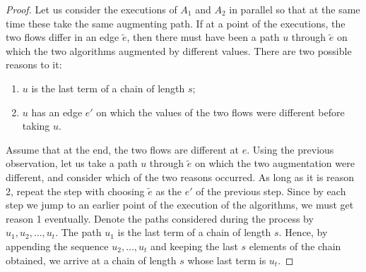 \documentclass[12pt,a4paper]{article}
\renewcommand{\:}{\colon}
\begin{document}
\begin{proof}
Let us consider the executions of $A_1$ and $A_2$ in parallel so that at the same time these take the same augmenting path.
If at a point of the executions, the two flows differ in an edge $\tilde{e}$, then there must have been a path $u$ through $\tilde{e}$ on which the two algorithms augmented by different values. 
There are two possible reasons to it:
\begin{enumerate}
\item $u$ is the last term of a chain of length $s$;
\item $u$ has an edge $e'$ on which the values of the two flows were different before taking $u$.
\end{enumerate}
Assume that at the end, the two flows are different at $e$. 
Using the previous observation, let us take a path $u$ through $\tilde{e}$ on which the two augmentation were different, and consider which of the two reasons occurred. 
As long as it is reason 2, repeat the step with choosing $\tilde{e}$ as the $e'$ of the previous step. 
Since by each step we jump to an earlier point of the execution of the algorithms, we must get reason 1 eventually. 
Denote the paths considered during the process by $u_1, u_2, \ldots, u_t$. 
The path $u_1$ is the last term of a chain of length $s$. 
Hence, by appending the sequence $u_2, \ldots, u_t$ and keeping the last $s$ elements of the chain obtained, we arrive at a chain of length $s$ whose last term is $u_t$.
\end{proof}
\end{document}

